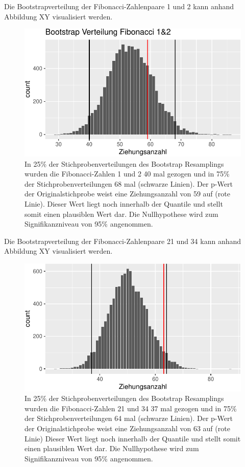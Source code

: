 \documentclass[ngerman,]{article}
\begin{document}
Die Bootstrapverteilung der Fibonacci-Zahlenpaare 1 und 2 kann anhand
Abbildung XY visualisiert werden.

\begin{figure}

\includegraphics{Abbildung/Bootstrap_1_2-1} \hfill{}

\caption{In 25\% der Stichprobenverteilungen des Bootstrap Resamplings wurden die Fibonacci-Zahlen 1 und 2 40 mal gezogen und in 75\% der Stichprobenverteilungen 68 mal (schwarze Linien). Der p-Wert der Originalstichprobe weist eine Ziehungsanzahl von 59 auf (rote Linie). Dieser Wert liegt noch innerhalb der Quantile und stellt somit einen plausiblen Wert dar. Die Nullhypothese wird zum Signifikanzniveau von 95\% angenommen.}\label{fig:Bootstrap_1_2}
\end{figure}

Die Bootstrapverteilung der Fibonacci-Zahlenpaare 21 und 34 kann anhand
Abbildung XY visualisiert werden.

\begin{figure}

\includegraphics{Abbildung/Bootstrap_21_34-1} \hfill{}

\caption{In 25\% der Stichprobenverteilungen des Bootstrap Resamplings wurden die Fibonacci-Zahlen 21 und 34 37 mal gezogen und in 75\% der Stichprobenverteilungen 64 mal (schwarze Linien). Der p-Wert der Originalstichprobe weist eine Ziehungsanzahl von 63 auf (rote Linie) Dieser Wert liegt noch innerhalb der Quantile und stellt somit einen plausiblen Wert dar. Die Nullhypothese wird zum Signifikanzniveau von 95\% angenommen.}\label{fig:Bootstrap_21_34}
\end{figure}
\end{document}
